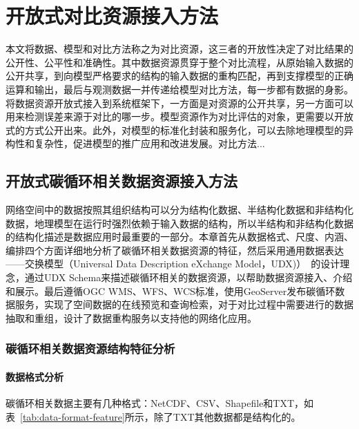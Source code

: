 \chapter{开放式对比资源接入方法}
本文将数据、模型和对比方法称之为对比资源，这三者的开放性决定了对比结果的公开性、公平性和准确性。其中数据资源贯穿于整个对比流程，从原始输入数据的公开共享，到向模型严格要求的结构的输入数据的重构匹配，再到支撑模型的正确运算和输出，最后与观测数据一并传递给模型对比方法，每一步都有数据的身影。将数据资源开放式接入到系统框架下，一方面是对资源的公开共享，另一方面可以用来检测误差来源于对比的哪一步。模型资源作为对比评估的对象，更需要以开放式的方式公开出来。此外，对模型的标准化封装和服务化，可以去除地理模型的异构性和复杂性，促进模型的推广应用和改进发展。对比方法...

\section{开放式碳循环相关数据资源接入方法}
网络空间中的数据按照其组织结构可以分为结构化数据、半结构化数据和非结构化数据，地理模型在运行时强烈依赖于输入数据的结构，所以半结构和非结构化数据的结构化描述是数据应用时最重要的一部分。本章首先从数据格式、尺度、内涵、编排四个方面详细地分析了碳循环相关数据资源的特征，然后采用通用数据表达——交换模型（Universal Data Description eXchange Model，UDX)）~\cite{乐松山2016面向地理模型共享与集成的数据适配方法研究}的设计理念，通过UDX Schema来描述碳循环相关的数据资源，以帮助数据资源接入、介绍和展示。最后遵循OGC WMS、WFS、WCS标准，使用GeoServer发布碳循环数据服务，实现了空间数据的在线预览和查询检索，对于对比过程中需要进行的数据抽取和重组，设计了数据重构服务以支持他的网络化应用。

\subsection{碳循环相关数据资源结构特征分析}

\subsubsection{数据格式分析}
碳循环相关数据主要有几种格式：NetCDF、CSV、Shapefile和TXT，如表~\ref{tab:data-format-feature}所示，除了TXT其他数据都是结构化的。

